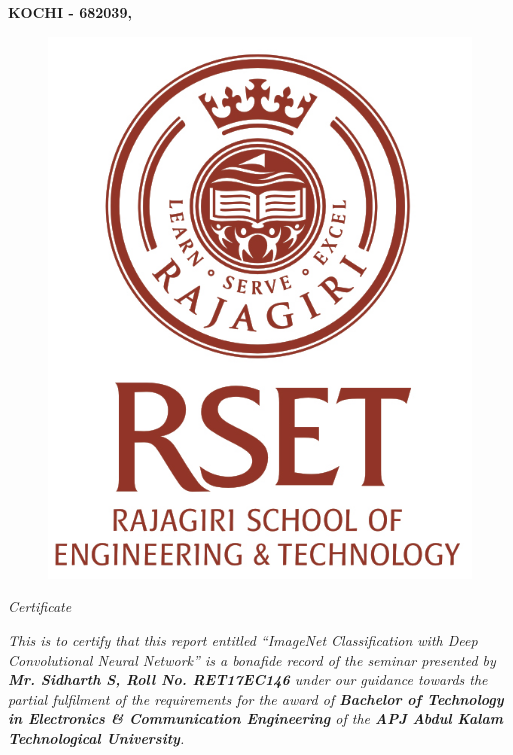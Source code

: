 \documentclass[11pt]{report}
\begin{document}
\begin{center} 
{\large \bf KOCHI - 682039, }\vspace{0.1cm}
\end{center}

\begin{figure}[hbt]
\centering
\centerline{\includegraphics[scale=0.6]{Rset Vertical.jpg}}
\end{figure}

\begin{center} 
{\Large \textit {Certificate}}\vspace{.1cm}
\end{center}

\justify
\doublespace
\textit {This is to certify that this report entitled ``ImageNet Classification with Deep Convolutional Neural Network'' is a bonafide record of the seminar presented by \textbf{Mr. Sidharth S, Roll No. RET17EC146} under our guidance towards the partial fulfilment of the requirements for the award of \textbf{Bachelor of Technology in Electronics \& Communication Engineering} of the \textbf{APJ Abdul Kalam Technological University}.}
\\[1cm]
\end{document}

